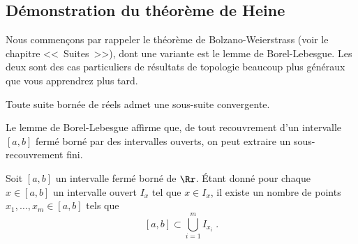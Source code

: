 \documentclass[class=report,crop=false]{standalone}
\begin{document}
\subsection{Démonstration du théorème de Heine}

Nous commençons par rappeler le théorème de Bolzano-Weierstrass (voir le chapitre <<~Suites~>>), 
dont une variante est le lemme de Borel-Lebesgue. Les deux sont des cas particuliers de 
résultats de topologie beaucoup plus généraux que vous apprendrez plus tard.
\begin{theoreme}
\label{th:BW}
Toute suite bornée de réels admet une sous-suite convergente.
\end{theoreme}


Le lemme de Borel-Lebesgue affirme que, de tout recouvrement d'un
intervalle $[a,b]$ fermé borné par des intervalles ouverts, on peut extraire un
sous-recouvrement fini. 
\begin{lemme}
\label{lem:borellebesgue}
Soit $[a,b]$ un intervalle fermé borné de $\Rr$. 
\'Etant donné pour chaque $x\in[a,b]$ un intervalle ouvert $I_x$ tel que $x\in I_x$,
il existe un nombre  de points $x_1,\ldots,x_m \in [a,b]$ tels que
$$[a,b] \subset \bigcup_{i=1}^m I_{x_i}\;.$$ 
\end{lemme}


\end{document}
